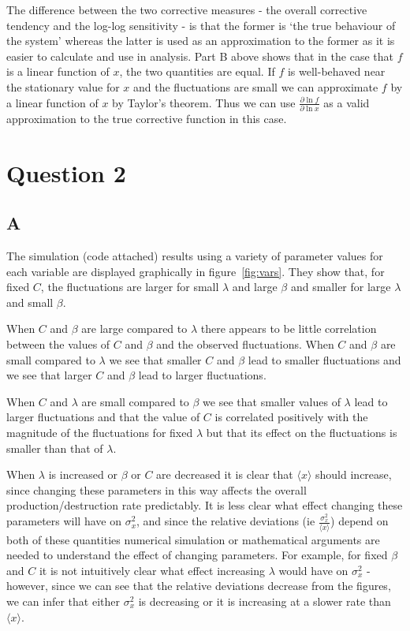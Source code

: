 \documentclass[a4paper,12pt]{article}
\begin{document}
The difference between the two corrective measures - the overall corrective tendency and the log-log sensitivity - is that the former is `the true behaviour of the system' whereas the latter is used as an approximation to the former as it is easier to calculate and use in analysis. Part B above shows that in the case that $f$ is a linear function of $x$, the two quantities are equal. If $f$ is well-behaved near the stationary value for $x$ and the fluctuations are small we can approximate $f$ by a linear function of $x$ by Taylor's theorem. Thus we can use $\frac{\partial \ln f}{\partial \ln x}$ as a valid approximation to the true corrective function in this case.


\section*{Question 2}

\subsection*{A}
The simulation (code attached) results using a variety of parameter values for each variable are displayed graphically in figure~\ref{fig:vars}. They show that, for fixed $C$, the fluctuations are larger for small $\lambda$ and large $\beta$ and smaller for large $\lambda$ and small $\beta$. 

When $C$ and $\beta$ are large compared to $\lambda$ there appears to be little correlation between the values of $C$ and $\beta$ and the observed fluctuations. When $C$ and $\beta$ are small compared to $\lambda$ we see that smaller $C$ and $\beta$ lead to smaller fluctuations and we see that larger $C$ and $\beta$ lead to larger fluctuations.

When $C$ and $\lambda$ are small compared to $\beta$ we see that smaller values of $\lambda$ lead to larger fluctuations and that the value of $C$ is correlated positively with the magnitude of the fluctuations for fixed $\lambda$ but that its effect on the fluctuations is smaller than that of $\lambda$.

When $\lambda$ is increased or $\beta$ or $C$ are decreased it is clear that $\langle x \rangle$ should increase, since changing these parameters in this way affects the overall production/destruction rate predictably. It is less clear what effect changing these parameters will have on $\sigma^2_x$, and since the relative deviations (ie $\frac{\sigma^2_x}{\langle x \rangle}$) depend on both of these quantities numerical simulation or mathematical arguments are needed to understand the effect of changing parameters. For example, for fixed $\beta$ and $C$ it is not intuitively clear what effect increasing $\lambda$ would have on $\sigma^2_x$ - however, since we can see that the relative deviations decrease from the figures, we can infer that either $\sigma^2_x$ is decreasing or it is increasing at a slower rate than $\langle x \rangle$.
\end{document}
